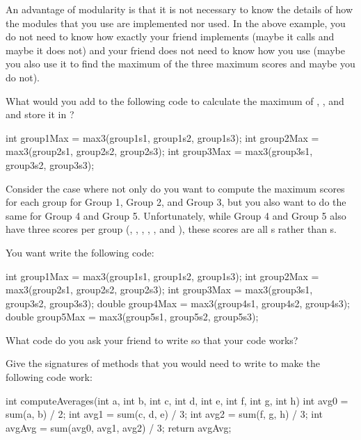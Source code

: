 An advantage of modularity is that it is not necessary
to know the details of how the modules that you use
are implemented nor used.
In the above example, you do not need to know how exactly your
friend implements  (maybe it calls 
and maybe it does not) and your friend does not need to
know how you use  (maybe you also use it to
find the maximum of the three maximum scores and maybe
you do not).

\begin{example}
What would you add to the following code to calculate
the maximum of , ,
and  and store it in ?

\begin{code}
int group1Max = max3(group1s1, group1s2, group1s3);
int group2Max = max3(group2s1, group2s2, group2s3);
int group3Max = max3(group3s1, group3s2, group3s3);
\end{code}
\end{example}

\begin{example}
Consider the case where not only do you
want to compute the maximum scores for each group
for Group 1, Group 2, and Group 3, but you
also want to do the same for Group 4 and Group 5.
Unfortunately, while Group 4 and Group 5 also have
three scores per group (, ,
, , ,
and ), these scores are all s
rather than s.

You want write the following code:
\begin{code}
int group1Max = max3(group1s1, group1s2, group1s3);
int group2Max = max3(group2s1, group2s2, group2s3);
int group3Max = max3(group3s1, group3s2, group3s3);
double group4Max = max3(group4s1, group4s2, group4s3);
double group5Max = max3(group5s1, group5s2, group5s3);
\end{code}

What code do you ask your friend to write
so that your code works?
\end{example}

\exercisesection

\begin{exercise}
Give the signatures of methods that you would need to write
to make the following code work:
\begin{code}
int computeAverages(int a, int b, int c, int d, int e, int f, int g, int h) {
  int avg0 = sum(a, b) / 2;
  int avg1 = sum(c, d, e) / 3;
  int avg2 = sum(f, g, h) / 3;
  int avgAvg = sum(avg0, avg1, avg2) / 3;
  return avgAvg;
}
\end{code}
\end{exercise}


